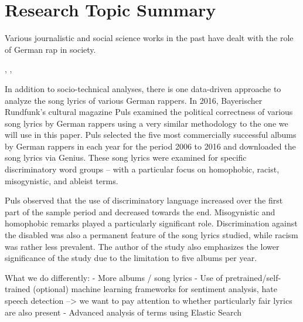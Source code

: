 \section{Research Topic Summary}

Various journalistic and social science works in the past have dealt with the role of German rap in society.

\cite{heinisch2018schlampe},
\cite{ahlers_2019},
\cite{wiegel2011deutscher}

In addition to socio-technical analyses, there is one data-driven approache to analyze the song lyrics of various German rappers. In 2016, Bayerischer Rundfunk's cultural magazine Puls \cite{puls_2016} examined the political correctness of various song lyrics by German rappers using a very similar methodology to the one we will use in this paper. Puls selected the five most commercially successful albums by German rappers in each year for the period 2006 to 2016 and downloaded the song lyrics via Genius. These song lyrics were examined for specific discriminatory word groups -- with a particular focus on homophobic, racist, misogynistic, and ableist terms.

Puls observed that the use of discriminatory language increased over the first part of the sample period and decreased towards the end. Misogynistic and homophobic remarks played a particularly significant role. Discrimination against the disabled was also a permanent feature of the song lyrics studied, while racism was rather less prevalent. The author of the study also emphasizes the lower significance of the study due to the limitation to five albums per year.

What we do differently:
- More albums / song lyrics
- Use of pretrained/self-trained (optional) machine learning frameworks for sentiment analysis, hate speech detection --> we want to pay attention to whether particularly fair lyrics are also present
- Advanced analysis of terms using Elastic Search

